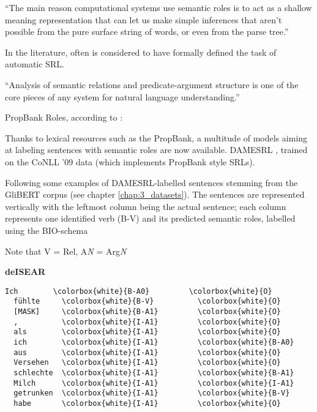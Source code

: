 ``The main reason computational systems use semantic roles is to act as a shallow meaning
representation that can let us make simple inferences that aren’t possible from the pure surface
string of words, or even from the parse tree.'' \cite[p.~375]{jurafsky2019speech}

In the literature, often \cite{gildea2002automatic} is considered to have formally defined the
task of automatic SRL.

``Analysis of semantic relations and predicate-argument structure is one of the core pieces of any
system for natural language understanding.'' \citep{palmer2010semantic}

PropBank Roles, according to \cite{bonial2012english}:

Thanks to lexical resources such as the PropBank, a multitude of models aiming at labeling
sentences with semantic roles are now available. DAMESRL \citep{do2018flexible}, trained on
the CoNLL '09 \citep{hajivc2009conll} data (which implements PropBank style SRLs).

Following some examples of DAMESRL-labelled sentences stemming from the GliBERT corpus (see chapter
\ref{chap:3_datasets}). The sentences are represented vertically with the leftmost column being the
actual sentence; each column represents one identified verb (B-V) and its predicted semantic roles,
labelled using the BIO-schema

Note that V = Rel, A\textit{N} = Arg\textit{N}

\textbf{deISEAR}

\begin{Verbatim}[commandchars=\\\{\}]
  Ich        \colorbox{white}{B-A0}         \colorbox{white}{O}
  fühlte     \colorbox{white}{B-V}          \colorbox{white}{O}
  [MASK]     \colorbox{white}{B-A1}         \colorbox{white}{O}
  ,          \colorbox{white}{I-A1}         \colorbox{white}{O}
  als        \colorbox{white}{I-A1}         \colorbox{white}{O}
  ich        \colorbox{white}{I-A1}         \colorbox{white}{B-A0}
  aus        \colorbox{white}{I-A1}         \colorbox{white}{O}
  Versehen   \colorbox{white}{I-A1}         \colorbox{white}{O}
  schlechte  \colorbox{white}{I-A1}         \colorbox{white}{B-A1}
  Milch      \colorbox{white}{I-A1}         \colorbox{white}{I-A1}
  getrunken  \colorbox{white}{I-A1}         \colorbox{white}{B-V}
  habe       \colorbox{white}{I-A1}         \colorbox{white}{O}
\end{Verbatim}

